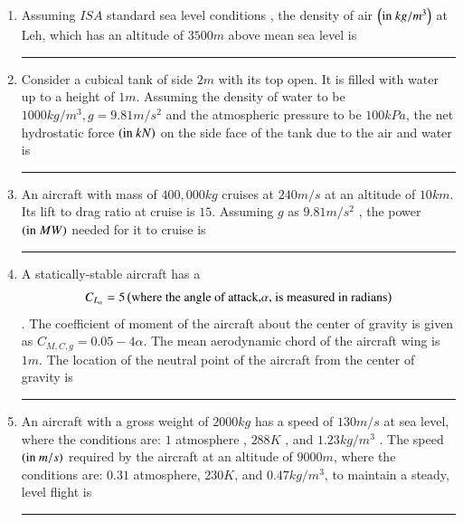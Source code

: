 \documentclass[journal]{IEEEtran}
\begin{document}
\begin{enumerate}
\item Assuming $ISA$ standard sea level conditions , the density of air $\left(\text{in } kg/m^3\right)$ at Leh, which has an altitude of $3500m$ above mean sea level is \rule{2cm}{0.2pt} 
\item Consider a cubical tank of side $2 m$ with its top open. It is filled with water up to a height of $1 m$. Assuming the density of water to be $1000 kg/m^3, g = 9.81 m/s^2$ and the atmospheric pressure to be $100 kPa$, the net hydrostatic force $\left(\text{in } kN\right)$ on the side face of the tank due to the air and water is \rule{2cm}{0.2pt} 
\item An aircraft with mass of $400,000 kg$ cruises at $240 m/s$ at an altitude of $10 km$. Its lift to drag ratio at cruise is $15$. Assuming $g$ as $9.81 m/s^2$ , the power $\left(\text{in } MW\right)$ needed for it to cruise is\rule{2cm}{0.2pt} 
\item A statically-stable aircraft has a 
	\begin{align*}
		C_{L_{\alpha}}=5 \left(\text{where the angle of attack,} \alpha \text{, is measured in radians}\right)
	\end{align*}. The coefficient of moment of the aircraft about the center of gravity is given as $C_{M,C,g}=0.05-4\alpha$. The mean aerodynamic chord of the aircraft wing is $1 m$. The location  of the neutral point of the aircraft from the center of gravity is \rule{2cm}{0.2pt} 

\item An aircraft with a gross weight of $2000kg$ has a speed of $130m/s$ at sea level, where the conditions are: $1$ atmosphere , $288K$ , and $1.23 kg/m^3$ . The speed $\left(\text{in } m/s\right)$ required by the aircraft at an altitude of $9000m$, where the conditions are: $0.31$ atmosphere, $230K$, and $0.47 kg/m^3$, to maintain a steady, level flight is \rule{2cm}{0.2pt}  
	\end{enumerate}
\end{document}
